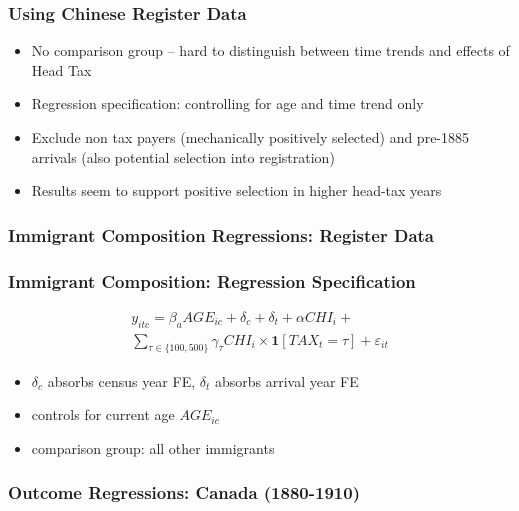 \documentclass[pdf]{beamer}
\begin{document}
\begin{frame}[label = occ_n]
    \frametitle{Using Chinese Register Data}
    \begin{itemize}
        \item No comparison group -- hard to distinguish between time trends and effects of Head Tax 
        \item Regression specification: controlling for age and time trend only
        \item Exclude non tax payers (mechanically positively selected) and pre-1885 arrivals (also potential selection into registration)
        \item Results seem to support positive selection in higher head-tax years 
    \end{itemize}
\end{frame}

\begin{frame}[label = register_regs]
	\frametitle{Immigrant Composition Regressions: Register Data}
    \centering
    \begin{table}[H]
		\resizebox{0.65\textwidth}{!}{
            
		}
	\end{table} 
    \hyperlink{register_labor}{} 
    \hyperlink{register_height}{}
\end{frame}

\begin{frame}[label = reg_spec]
    \frametitle{Immigrant Composition: Regression Specification}
    \centering
    \begin{multline}
        y_{itc} = \beta_a AGE_{ic} + \delta_c + \delta_t + \alpha CHI_i + \\ \sum_{\tau \in \{100,500\}} \gamma_{\tau} CHI_i \times \mathbf{1}[TAX_t = \tau] + \varepsilon_{it}
    \end{multline}
    \begin{itemize}
        \item $\delta_c$ absorbs census year FE, $\delta_t$ absorbs arrival year FE
        \item controls for current age $AGE_{ic}$
        \item comparison group: all other immigrants
    \end{itemize}
\end{frame}

\begin{frame}[label = reg_can]
	\frametitle{Outcome Regressions: Canada (1880-1910)}
    \centering
    \begin{table}[H]
		\resizebox{\textwidth}{!}{
            
		}
	\end{table}  
\end{frame}
\end{document}
